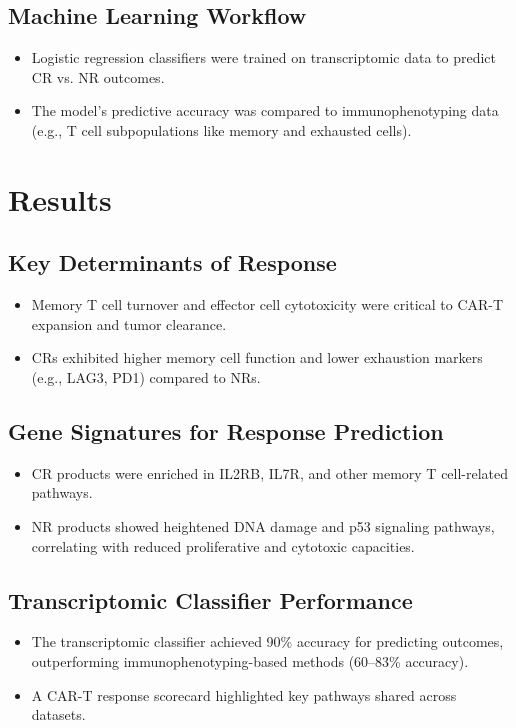 \documentclass[12pt]{article}
\begin{document}
\subsection*{Machine Learning Workflow}
\begin{itemize}
    \item Logistic regression classifiers were trained on transcriptomic data to predict CR vs. NR outcomes.
    \item The model's predictive accuracy was compared to immunophenotyping data (e.g., T cell subpopulations like memory and exhausted cells).
\end{itemize}

\section*{Results}

\subsection*{Key Determinants of Response}
\begin{itemize}
    \item Memory T cell turnover and effector cell cytotoxicity were critical to CAR-T expansion and tumor clearance.
    \item CRs exhibited higher memory cell function and lower exhaustion markers (e.g., LAG3, PD1) compared to NRs.
\end{itemize}

\subsection*{Gene Signatures for Response Prediction}
\begin{itemize}
    \item CR products were enriched in IL2RB, IL7R, and other memory T cell-related pathways.
    \item NR products showed heightened DNA damage and p53 signaling pathways, correlating with reduced proliferative and cytotoxic capacities.
\end{itemize}

\subsection*{Transcriptomic Classifier Performance}
\begin{itemize}
    \item The transcriptomic classifier achieved 90\% accuracy for predicting outcomes, outperforming immunophenotyping-based methods (60--83\% accuracy).
    \item A CAR-T response scorecard highlighted key pathways shared across datasets.
\end{itemize}
\end{document}
